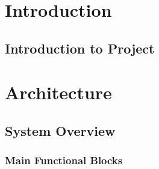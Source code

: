 \documentclass[a4paper,12pt]{book}
\begin{document}
\tableofcontents
\chapter{Introduction}
\section{Introduction to Project}
\chapter{Architecture}
\section{System Overview}
\subsection{Main Functional Blocks}
\end{document}
